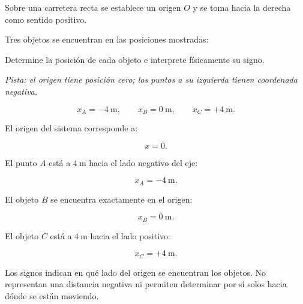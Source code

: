 \begin{ejercicio}
Sobre una carretera recta se establece un origen \(O\) y se toma hacia la derecha como sentido positivo.

Tres objetos se encuentran en las posiciones mostradas:

\begin{center}
\end{center}

Determine la posición de cada objeto e interprete físicamente su signo.

\textit{Pista: el origen tiene posición cero; los puntos a su izquierda tienen coordenada negativa.}
\end{ejercicio}

\begin{respuesta}
\[ x_A=-\SI{4}{\meter},\qquad x_B=\SI{0}{\meter},\qquad x_C=+\SI{4}{\meter}. \]
\end{respuesta}

\begin{explicacion}
El origen del sistema corresponde a:

\[ x=0. \]

El punto \(A\) está a \(\SI{4}{\meter}\) hacia el lado negativo del eje:

\[ \boxed{x_A=-\SI{4}{\meter}}. \]

El objeto \(B\) se encuentra exactamente en el origen:

\[ \boxed{x_B=\SI{0}{\meter}}. \]

El objeto \(C\) está a \(\SI{4}{\meter}\) hacia el lado positivo:

\[ \boxed{x_C=+\SI{4}{\meter}}. \]

Los signos indican en qué lado del origen se encuentran los objetos. No representan una distancia negativa ni permiten determinar por sí solos hacia dónde se están moviendo.
\end{explicacion}


